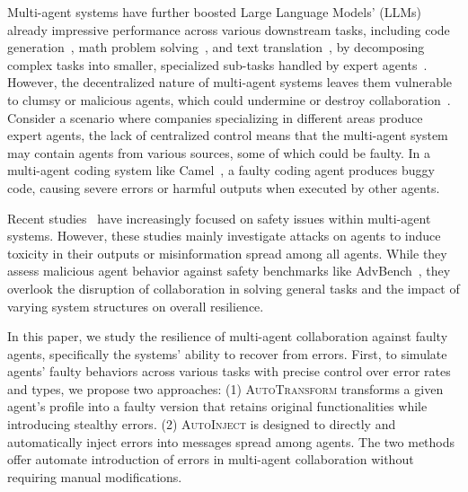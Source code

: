 \documentclass{article}
\theoremstyle{plain}
\theoremstyle{definition}
\theoremstyle{remark}
\begin{document}
Multi-agent systems have further boosted Large Language Models' (LLMs) already impressive performance across various downstream tasks, including code generation~\cite{liu2024your, lee2024unified}, math problem solving~\cite{lu2024mathvista, liang2023encouraging}, and text translation~\cite{jiao2023chatgpt, wu2024perhaps}, by decomposing complex tasks into smaller, specialized sub-tasks handled by expert agents~\cite{chen2023agentverse, li2024agent}.
However, the decentralized nature of multi-agent systems leaves them vulnerable to clumsy or malicious agents, which could undermine or destroy collaboration~\cite{chen2025internet}.
Consider a scenario where companies specializing in different areas produce expert agents, the lack of centralized control means that the multi-agent system may contain agents from various sources, some of which could be faulty.
In a multi-agent coding system like Camel~\cite{li2024camel}, a faulty coding agent produces buggy code, causing severe errors or harmful outputs when executed by other agents.

Recent studies~\cite{zhang2024psysafe, tian2023evil, amayuelas2024multiagent, ju2024flooding, yu2024infecting} have increasingly focused on safety issues within multi-agent systems.
However, these studies mainly investigate attacks on agents to induce toxicity in their outputs or misinformation spread among all agents.
While they assess malicious agent behavior against safety benchmarks like AdvBench~\cite{zou2023universal}, they overlook the disruption of collaboration in solving general tasks and the impact of varying system structures on overall resilience.

In this paper, we study the resilience of multi-agent collaboration against faulty agents, specifically the systems' ability to recover from errors.
First, to simulate agents' faulty behaviors across various tasks with precise control over error rates and types, we propose two approaches:
(1) \textsc{AutoTransform} transforms a given agent's profile into a faulty version that retains original functionalities while introducing stealthy errors.
(2) \textsc{AutoInject} is designed to directly and automatically inject errors into messages spread among agents.
The two methods offer automate introduction of errors in multi-agent collaboration without requiring manual modifications.
\end{document}
